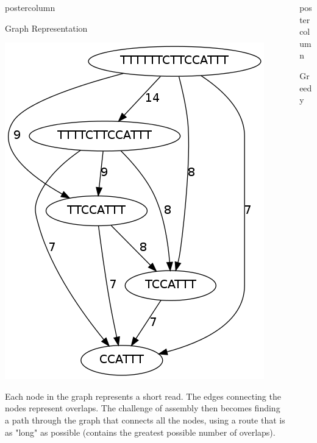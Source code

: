 \documentclass[final,hyperref={pdfpagelabels=false}]{beamer}
\newlength{\columnheight}
\begin{document}
\begin{frame}
\begin{columns}
\begin{column}{.32\textwidth}
\begin{beamercolorbox}[center,wd=\textwidth]{postercolumn}
\begin{minipage}[T]{.95\textwidth}
{\begin{block}{Graph Representation}
\begin{center}
                                \includegraphics[scale=0.75]{example_graph}
                            \end{center}
                            Each node in the graph represents a short read. The
                            edges connecting the nodes represent overlaps.  The
                            challenge of assembly then becomes finding a path
                            through the graph that connects all the nodes,
                            using a route that is as "long" as possible
                            (contains the greatest possible number of overlaps).
                       \end{block}
                } \end{minipage}
            \end{beamercolorbox}
        \end{column}
        \begin{column}{.32\textwidth}
            \begin{beamercolorbox}[center,wd=\textwidth]{postercolumn}
                \begin{minipage}[T]{.95\textwidth}
                    \parbox[t][\columnheight]{\textwidth}{
                        \begin{block}{Greedy}

\end{block}}
\end{minipage}
\end{beamercolorbox}
\end{column}
\end{columns}
\end{frame}
\end{document}
